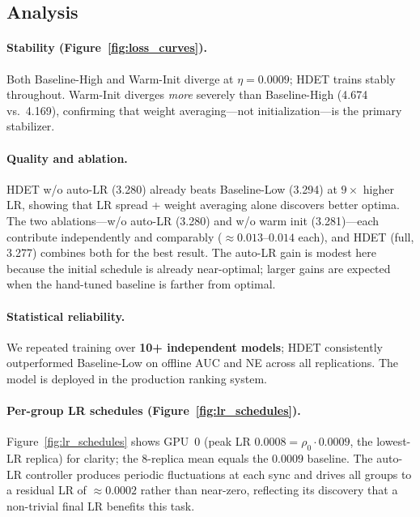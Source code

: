 \documentclass{article}
\begin{document}
\subsection{Analysis}

\paragraph{Stability (Figure~\ref{fig:loss_curves}).}
Both Baseline-High and Warm-Init diverge at $\eta{=}0.0009$; HDET trains stably
throughout.
Warm-Init diverges \emph{more} severely than Baseline-High (4.674 vs.\ 4.169),
confirming that weight averaging---not initialization---is the primary stabilizer.

\paragraph{Quality and ablation.}
HDET w/o auto-LR (3.280) already beats Baseline-Low (3.294) at $9\times$ higher LR,
showing that LR spread + weight averaging alone discovers better optima.
The two ablations---w/o auto-LR (3.280) and w/o warm init (3.281)---each contribute
independently and comparably (${\approx}0.013$--$0.014$ each), and HDET (full, 3.277)
combines both for the best result.
The auto-LR gain is modest here because the initial schedule is already near-optimal;
larger gains are expected when the hand-tuned baseline is farther from optimal.

\paragraph{Statistical reliability.}
We repeated training over \textbf{10+ independent models}; HDET consistently
outperformed Baseline-Low on offline AUC and NE across all replications.
The model is deployed in the production ranking system.

\paragraph{Per-group LR schedules (Figure~\ref{fig:lr_schedules}).}
Figure~\ref{fig:lr_schedules} shows GPU~0 (peak LR $0.0008 = \rho_0 \cdot 0.0009$,
the lowest-LR replica) for clarity; the 8-replica mean equals the $0.0009$ baseline.
The auto-LR controller produces periodic fluctuations at each sync and drives all
groups to a residual LR of ${\approx}0.0002$ rather than near-zero,
reflecting its discovery that a non-trivial final LR benefits this task.
\end{document}
